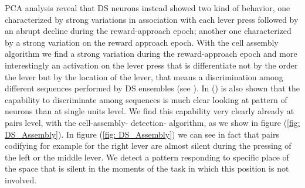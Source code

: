 \documentclass{article}
\begin{document}
PCA analysis reveal that DS neurons instead showed two kind of behavior, one characterized by strong variations in association with each lever press followed by an abrupt decline during the reward-approach epoch; another one characterized by a strong variation on the reward approach epoch. With the cell assembly algorithm we find a strong variation during the reward-approach epoch and more interestingly an activation on the lever press that is differentiate not by the order the lever but by the location of the lever, that means a discrimination among different sequences performed by DS ensembles (see \cite{Lya}). In (\cite{LyaN}) is also shown that the capability to discriminate among sequences is much clear looking at pattern of neurons than at single units level. We find this capability very clearly already at pairs level, with the cell-assembly- detection- algorithm, as we show in figure (\ref{fig: DS_Assembly}).
In figure (\ref{fig: DS_Assembly}) we can see in fact that pairs codifying for example for the right lever are almost silent during the pressing of the left or the middle lever. We detect a pattern responding to specific place of the space that is silent in the moments of the task in which this position is not involved.
\end{document}
